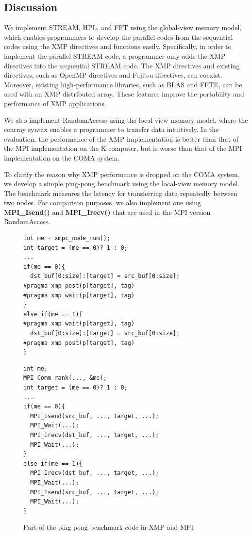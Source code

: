 \documentclass[graybox]{svmult}
\begin{document}
\subsection{Discussion}\label{sec:discussion}
We implement STREAM, HPL, and FFT using the global-view memory model, which
enables programmers to develop the parallel codes from the sequential codes using the XMP directives and functions easily.
Specifically, in order to implement the parallel STREAM code, a programmer only adds the XMP directives into the sequential STREAM code.
The XMP directives and existing directives, such as OpenMP directives and Fujitsu directives, can coexist.
Moreover, existing high-performance libraries, such as BLAS and FFTE, can be used with an XMP distributed array.
These features improve the portability and performance of XMP applications.

We also implement RandomAccess using the local-view memory model, where
the coarray syntax enables a programmer to transfer data intuitively.
In the evaluation,
the performance of the XMP implementation is better than that of the MPI implementation on the K computer,
but is worse than that of the MPI implementation on the COMA system.

To clarify the reason why XMP performance is dropped on the COMA system,
we develop a simple ping-pong benchmark using the local-view memory model.
The benchmark measures the latency for transferring data repeatedly between two nodes.
For comparison purposes, we also implement one using {\bf MPI\_Isend()} and {\bf MPI\_Irecv()} that are used in the MPI version RandomAccess.

\begin{figure}[h]
\begin{center}
\begin{lstlisting}
int me = xmpc_node_num();
int target = (me == 0)? 1 : 0;
...
if(me == 0){
  dst_buf[0:size]:[target] = src_buf[0:size];
#pragma xmp post(p[target], tag)
#pragma xmp wait(p[target], tag)
}
else if(me == 1){
#pragma xmp wait(p[target], tag)
  dst_buf[0:size]:[target] = src_buf[0:size];
#pragma xmp post(p[target], tag)
}
\end{lstlisting}
\end{center}

\begin{center}
\begin{lstlisting}
int me;
MPI_Comm_rank(..., &me);
int target = (me == 0)? 1 : 0;
...
if(me == 0){
  MPI_Isend(src_buf, ..., target, ...);
  MPI_Wait(...);
  MPI_Irecv(dst_buf, ..., target, ...);
  MPI_Wait(...);
}
else if(me == 1){
  MPI_Irecv(dst_buf, ..., target, ...);
  MPI_Wait(...);
  MPI_Isend(src_buf, ..., target, ...);
  MPI_Wait(...);
}
\end{lstlisting}
\end{center}
\caption{Part of the ping-pong benchmark code in XMP and MPI\cite{hpca}} \label{fig:pingpong-src}
\end{figure}
\end{document}
